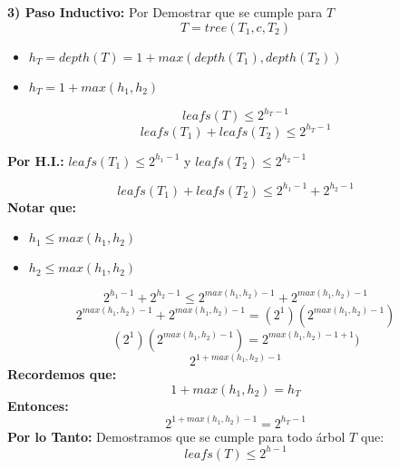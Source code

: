 \textbf{3) Paso Inductivo:} Por Demostrar que se cumple para  $T$
\[
T = tree(T_{1}, c , T_{2})
\]
\begin{itemize}
    \item $h_{T} = depth(T) = 1 + max(depth(T_{1}), depth(T_{2}))$
    \item $h_{T} = 1 + max(h_{1}, h_{2})$
\end{itemize}
\[
leafs(T) \leq 2^{h_{T}-1}
\]
\[
leafs(T_{1}) + leafs(T_{2}) \leq 2^{h_{T}-1}
\]
\begin{center}
    \textbf{Por H.I.:} $leafs(T_{1}) \leq 2^{h_{1}-1}$  y     $leafs(T_{2}) \leq 2^{h_{2}-1}$ 
\end{center}
\[
leafs(T_{1}) + leafs(T_{2}) \leq 2^{h_{1}-1} + 2^{h_{2}-1}
\]
\textbf{Notar que:}
\begin{itemize}
    \item $h_{1} \leq max(h_{1}, h_{2})$
    \item $h_{2} \leq max(h_{1}, h_{2})$
\end{itemize}
\[
2^{h_{1}-1} + 2^{h_{2}-1} \leq 2^{max(h_{1}, h_{2}) -1} + 2^{max(h_{1}, h_{2}) -1} 
\]
\[
2^{max(h_{1}, h_{2}) -1} + 2^{max(h_{1}, h_{2}) -1} = (2^{1})(2^{max(h_{1}, h_{2}) -1})
\]
\[
(2^{1})(2^{max(h_{1}, h_{2}) -1}) = 2^{max(h_{1}, h_{2}) -1 +1})
\]
\[
2^{ 1+ max(h_{1}, h_{2}) -1 }
\]
\textbf{Recordemos que:}
\[
1 + max(h_{1}, h_{2}) = h_{T}
\]
\textbf{Entonces:}
\[
2^{ 1+ max(h_{1}, h_{2}) -1 } = 2^{ h_{T} -1 }
\]
\textbf{Por lo Tanto:} Demostramos que se cumple para todo árbol $T$ que:
\[
leafs(T) \leq 2^{h -1}
\]
